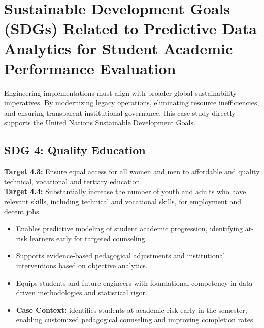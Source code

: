 \section{Sustainable Development Goals (SDGs) Related to Predictive Data Analytics for Student Academic Performance Evaluation}
Engineering implementations must align with broader global sustainability imperatives. By modernizing legacy operations, eliminating resource inefficiencies, and ensuring transparent institutional governance, this case study directly supports the United Nations Sustainable Development Goals.

\subsection{SDG 4: Quality Education}
\noindent\textbf{Target 4.3:} Ensure equal access for all women and men to affordable and quality technical, vocational and tertiary education. \\
\noindent\textbf{Target 4.4:} Substantially increase the number of youth and adults who have relevant skills, including technical and vocational skills, for employment and decent jobs.
\begin{itemize}
  \item Enables predictive modeling of student academic progression, identifying at-risk learners early for targeted counseling.
  \item Supports evidence-based pedagogical adjustments and institutional interventions based on objective analytics.
  \item Equips students and future engineers with foundational competency in data-driven methodologies and statistical rigor.
  \item \textbf{Case Context:} identifies students at academic risk early in the semester, enabling customized pedagogical counseling and improving completion rates.
\end{itemize}

